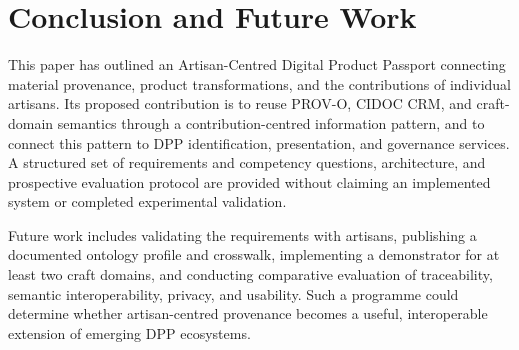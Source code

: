 \documentclass[conference]{IEEEtran}
\begin{document}
\section{Conclusion and Future Work}
This paper has outlined an Artisan-Centred Digital Product Passport connecting material provenance, product transformations, and the contributions of individual artisans. Its proposed contribution is to reuse PROV-O, CIDOC CRM, and craft-domain semantics through a contribution-centred information pattern, and to connect this pattern to DPP identification, presentation, and governance services. A structured set of requirements and competency questions, architecture, and prospective evaluation protocol are provided without claiming an implemented system or completed experimental validation.

Future work includes validating the requirements with artisans, publishing a documented ontology profile and crosswalk, implementing a demonstrator for at least two craft domains, and conducting comparative evaluation of traceability, semantic interoperability, privacy, and usability. Such a programme could determine whether artisan-centred provenance becomes a useful, interoperable extension of emerging DPP ecosystems.



\end{document}
